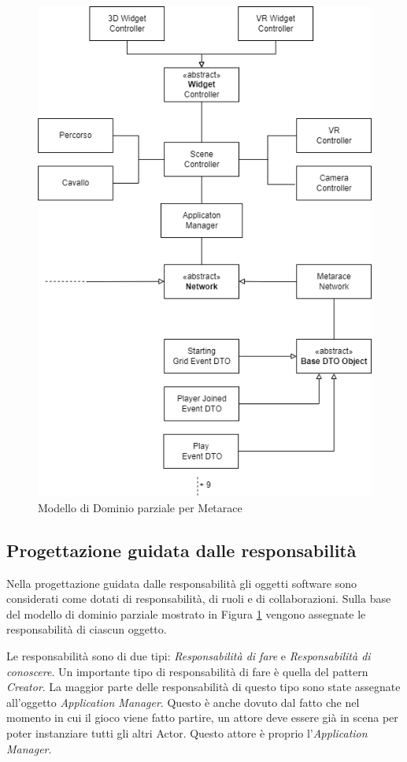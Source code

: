 \begin{figure}[!ht]
    \centering
    \includegraphics[width=12cm]{figure/Modello_di_Dominio_Metarace.drawio.png}
    \caption{Modello di Dominio parziale per Metarace}
    \label{img:Dominio}
\end{figure}

    \subsection{Progettazione guidata dalle responsabilità}

    Nella progettazione guidata dalle responsabilità gli oggetti software sono considerati come dotati di responsabilità, di ruoli e di collaborazioni.
    Sulla base del modello di dominio  parziale mostrato in Figura \ref{img:Dominio} vengono assegnate le responsabilità di ciascun oggetto.

    Le responsabilità sono di due tipi: \textit{Responsabilità di fare} e \textit{Responsabilità di conoscere}.
    Un importante tipo di responsabilità di fare è quella del pattern \textit{Creator}.
    La maggior parte delle responsabilità di questo tipo sono state assegnate all'oggetto \textit{Application Manager}.  
    Questo è anche dovuto dal fatto che nel momento in cui il gioco viene fatto partire, un attore deve essere già in scena per poter instanziare tutti gli altri Actor.
    Questo attore è proprio l'\textit{Application Manager}.


